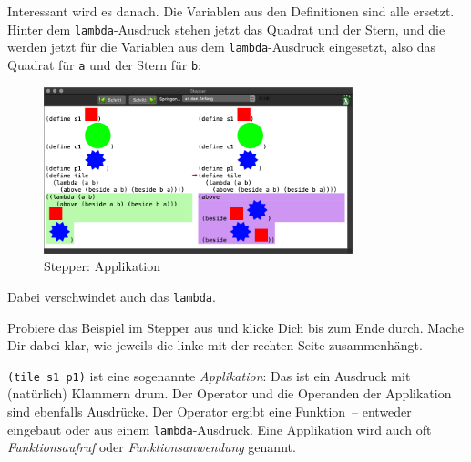 %
\noindent Interessant wird es danach. Die Variablen aus den Definitionen sind
alle ersetzt.  Hinter dem \texttt{lambda}-Ausdruck stehen jetzt das
Quadrat und der Stern, und die werden jetzt für die Variablen aus dem
\texttt{lambda}-Ausdruck eingesetzt, also das Quadrat für \texttt{a}
und der Stern für \texttt{b}:
%
\begin{figure}[H]
  \centering
  \includegraphics[width=0.8\textwidth]{i1prog/stepper-3}
  \caption{Stepper: Applikation}
  \label{fig:stepper-3}
\end{figure}
%
\noindent Dabei verschwindet auch das \texttt{lambda}.
%
\begin{aufgabe}
  Probiere das Beispiel im Stepper aus und klicke Dich bis zum Ende
  durch. Mache Dir dabei klar, wie jeweils die linke mit der rechten
  Seite zusammenhängt.
\end{aufgabe}
%
\texttt{(tile s1 p1)} ist eine sogenannte
\textit{Applikation}: Das ist ein Ausdruck mit
(natürlich) Klammern drum.  Der Operator und die Operanden der
Applikation sind ebenfalls Ausdrücke.  Der Operator ergibt eine
Funktion~-- entweder eingebaut oder aus einem
\texttt{lambda}-Ausdruck.  Eine Applikation wird auch oft
\textit{Funktionsaufruf} oder
\textit{Funktionsanwendung} genannt.

